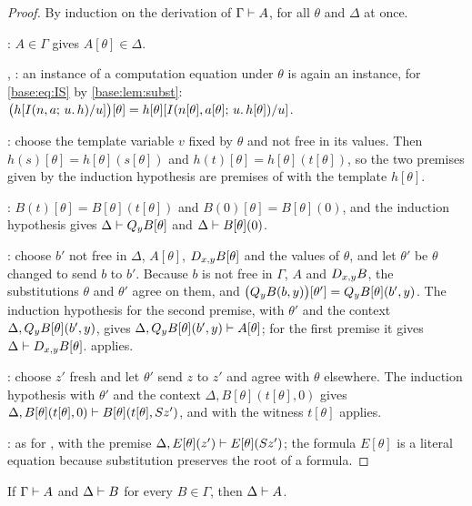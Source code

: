 \begin{proof}
By induction on the derivation of $\Gamma\vdash A$, for all $\theta$ and
$\Delta$ at once.

: $A\in\Gamma$ gives $A[\theta]\in\Delta$.

, : an instance of a computation equation under
$\theta$ is again an instance, for \eqref{base:eq:IS} by
\cref{base:lem:subst}:
$\bigl(h[I(n,a;\,u.\,h)/u]\bigr)[\theta]
 = h[\theta][I(n[\theta],a[\theta];\,u.\,h[\theta])/u]$.

: choose the template variable $v$ fixed by $\theta$ and not
free in its values.  Then $h(s)[\theta]=h[\theta](s[\theta])$ and
$h(t)[\theta]=h[\theta](t[\theta])$, so the two premises given by the
induction hypothesis are premises of  with the template
$h[\theta]$.

: $B(t)[\theta]=B[\theta](t[\theta])$ and $B(0)[\theta]=
B[\theta](0)$, and the induction hypothesis gives
$\Delta\vdash Q_{y}B[\theta]$ and $\Delta\vdash B[\theta](0)$.

: choose $b'$ not free in $\Delta$, $A[\theta]$,
$D_{x,y}B[\theta]$ and the values of $\theta$, and let $\theta'$ be $\theta$
changed to send $b$ to $b'$.  Because $b$ is not free in $\Gamma$, $A$ and
$D_{x,y}B$, the substitutions $\theta$ and $\theta'$ agree on them, and
$\bigl(Q_{y}B(b,y)\bigr)[\theta']=Q_{y}B[\theta](b',y)$.  The induction
hypothesis for the second premise, with $\theta'$ and the context
$\Delta,Q_{y}B[\theta](b',y)$, gives
$\Delta,Q_{y}B[\theta](b',y)\vdash A[\theta]$; for the first premise it gives
$\Delta\vdash D_{x,y}B[\theta]$.   applies.

: choose $z'$ fresh and let $\theta'$ send $z$ to $z'$ and
agree with $\theta$ elsewhere.  The induction hypothesis with $\theta'$ and
the context $\Delta,B[\theta](t[\theta],0)$ gives
$\Delta,B[\theta](t[\theta],0)\vdash B[\theta](t[\theta],S z')$, and
 with the witness $t[\theta]$ applies.

: as for , with the premise
$\Delta,E[\theta](z')\vdash E[\theta](S z')$; the formula $E[\theta]$ is
a literal equation because substitution preserves the root of a formula.
\end{proof}

\begin{lemma}[Cut]
\label{base:lem:cut}
If $\Gamma\vdash A$ and $\Delta\vdash B$ for every $B\in\Gamma$, then
$\Delta\vdash A$.
\end{lemma}

